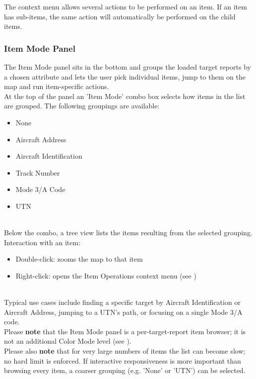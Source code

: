 The context menu allows several actions to be performed on an item. If an item has sub-items, the same action will automatically be performed on the child items.

\subsubsection{Item Mode Panel}
\label{sec:geo_item_mode}

The Item Mode panel sits in the bottom and groups the loaded target reports by a chosen attribute and lets the user pick individual items, jump to them on the map and run item-specific actions. \\

At the top of the panel an 'Item Mode' combo box selects how items in the list are grouped. The following groupings are available:

\begin{itemize}
\item None
\item Aircraft Address
\item Aircraft Identification
\item Track Number
\item Mode 3/A Code
\item UTN
\end{itemize}
\ \\

Below the combo, a tree view lists the items resulting from the selected grouping. Interaction with an item:

\begin{itemize}
\item Double-click: zooms the map to that item
\item Right-click: opens the Item Operations context menu (see )
\end{itemize}
\ \\

Typical use cases include finding a specific target by Aircraft Identification or Aircraft Address, jumping to a UTN's path, or focusing on a single Mode 3/A code. \\

Please \textbf{note} that the Item Mode panel is a per-target-report item browser; it is not an additional Color Mode level (see ). \\

Please also \textbf{note} that for very large numbers of items the list can become slow; no hard limit is enforced. If interactive responsiveness is more important than browsing every item, a coarser grouping (e.g. 'None' or 'UTN') can be selected.












